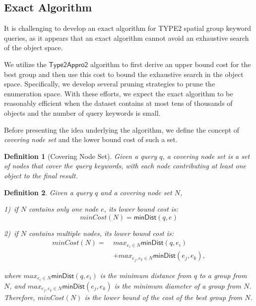 \documentclass{sig-alternate}
\newcommand{\minDist}{\mbox{$\mathsf{minDist}$}\xspace}
\newcounter{theorem}[section]
\newtheorem{defi}{Definition}
\begin{document}
\subsection{Exact Algorithm}\label{secsub:type2:exact}

It is challenging to develop an exact algorithm for TYPE2 spatial
group keyword queries, as it appears that an exact algorithm cannot
avoid an exhaustive search of the object space.

We utilize the $\mathsf{Type2Appro2}$ algorithm to first derive an
upper bound cost for the best group and then use this cost to bound
the exhaustive search in the object space.
%
Specifically, we develop several pruning strategies to prune the
enumeration space. With these efforts, we expect the exact algorithm
to be reasonably efficient when the dataset contains at most tens of
thousands of objects and the number of query keywords is small.

Before presenting the idea underlying the algorithm, we define the
concept of \emph{covering node set} and the lower bound cost of such a set.

\begin{defi}[Covering Node Set]
  Given a query $q$, a covering node set is a set of nodes that cover
  the query keywords, with each node contributing at least one object
  to the final result.
\end{defi}

\begin{defi}\label{defi:minCost}
Given a query $q$ and a covering node set $N$,

1)~if $N$ contains only one node $e$, its lower bound cost is:
\begin{displaymath}
minCost(N) = \minDist(q, e)
\end{displaymath}

2)~if $N$ contains multiple nodes, its lower bound cost is:
\begin{displaymath}
\begin{aligned}
minCost(N) = \ &max_{e_i \in N}\minDist(q, e_i)\\
& + max_{e_j, e_k \in N} \minDist(e_j, e_k),
\end{aligned}
\end{displaymath}

\noindent where $max_{e_i \in N}\minDist(q, e_i)$ is the minimum
distance from $q$ to a group from $N$, and $max_{e_j, e_k \in
N}\minDist(e_j, e_k)$ is the minimum diameter of a group from $N$.
Therefore, $minCost(N)$ is the lower bound of the cost of the best group
from $N$.
\end{defi}
\end{document}
